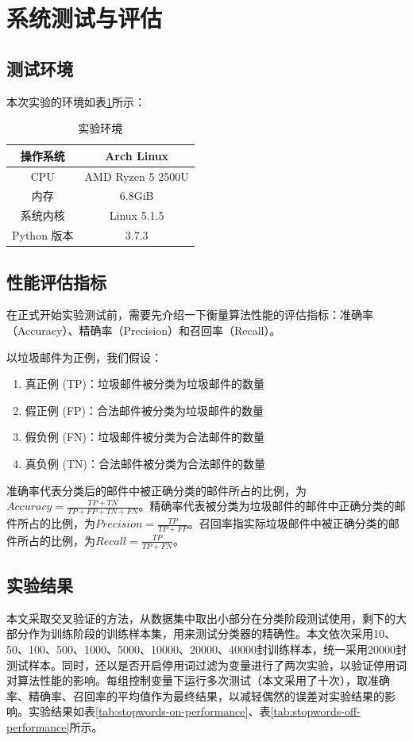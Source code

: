\documentclass[UTF8,zihao=-4]{ctexart}
\begin{document}
\newpage
\section{系统测试与评估}

\subsection{测试环境}
	本次实验的环境如表\ref{tab:env}所示：
	\begin{table}[!htpb]
		\centering
		\caption{实验环境}
		\label{tab:env}
		\begin{tabular}{|c|c|}
			\hline
			操作系统&Arch Linux\\
			\hline
			CPU&AMD Ryzen 5 2500U\\
			\hline
			内存&6.8GiB\\
			\hline
			系统内核&Linux 5.1.5\\
			\hline
			Python 版本&3.7.3\\
			\hline
		\end{tabular}
	\end{table}

\subsection{性能评估指标}
	在正式开始实验测试前，需要先介绍一下衡量算法性能的评估指标：准确率（Accuracy）、精确率（Precision）和召回率（Recall）。
	
	以垃圾邮件为正例，我们假设：
	
	\begin{enumerate}
		\item 真正例 (TP)：垃圾邮件被分类为垃圾邮件的数量
		\item 假正例 (FP)：合法邮件被分类为垃圾邮件的数量
		\item 假负例 (FN)：垃圾邮件被分类为合法邮件的数量
		\item 真负例 (TN)：合法邮件被分类为合法邮件的数量
	\end{enumerate}

	准确率代表分类后的邮件中被正确分类的邮件所占的比例，为$Accuracy=\frac{TP+TN}{TP+FP+TN+FN}$。精确率代表被分类为垃圾邮件的邮件中正确分类的邮件所占的比例，为$Precision=\frac{TP}{TP+FP}$。召回率指实际垃圾邮件中被正确分类的邮件所占的比例，为$Recall=\frac{TP}{TP+FN}$。

\subsection{实验结果}	
	本文采取交叉验证的方法，从数据集中取出小部分在分类阶段测试使用，剩下的大部分作为训练阶段的训练样本集，用来测试分类器的精确性。本文依次采用10、50、100、500、1000、5000、10000、20000、40000封训练样本，统一采用20000封测试样本。同时，还以是否开启停用词过滤为变量进行了两次实验，以验证停用词对算法性能的影响。每组控制变量下运行多次测试（本文采用了十次），取准确率、精确率、召回率的平均值作为最终结果，以减轻偶然的误差对实验结果的影响。实验结果如表\ref{tab:stopwords-on-performance}、表\ref{tab:stopwords-off-performance}所示。
	
\end{document}
